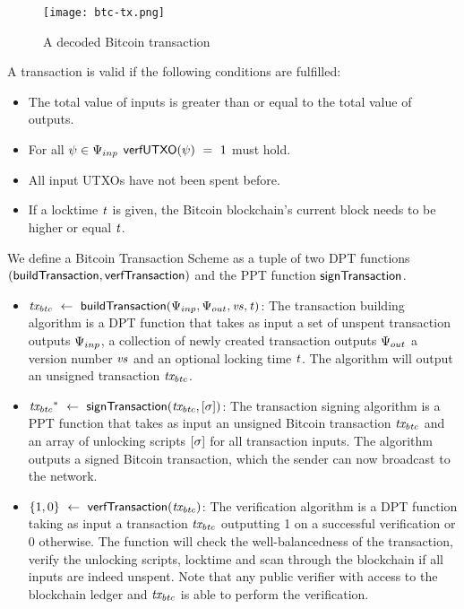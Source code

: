\begin{figure}
    \begin{center}
        \texttt{[image: btc-tx.png]}
    \end{center}
    \caption{A decoded Bitcoin transaction} \label{fig:btc-tx}
\end{figure}

A transaction is valid if the following conditions are fulfilled:

\begin{itemize}
    \item The total value of inputs is greater than or equal to the total value of outputs.
    \item For all $\psi \in \Psi_{inp}$ $\mathsf{verfUTXO}(\psi) ~=~ 1$ must hold.
    \item All input UTXOs have not been spent before.
    \item If a locktime $\mathit{t}$ is given, the Bitcoin blockchain's current block needs to be higher or equal $\mathit{t}$.
\end{itemize}

\begin{definition}
    We define a Bitcoin Transaction Scheme as a tuple of two DPT functions $(\mathsf{buildTransaction}, \mathsf{verfTransaction})$ and the PPT function $\mathsf{signTransaction}$.
    \begin{itemize}
        \item $\mathit{tx_{btc}} ~\leftarrow~ \mathsf{buildTransaction}(\Psi_{inp},\Psi_{out},\mathit{vs},\mathit{t})$: The transaction building algorithm is a DPT function that takes as input a set of unspent transaction outputs $\Psi_{inp}$, a collection of newly created transaction outputs $\Psi_{out}$ a version number $\mathit{vs}$ and an optional locking time $\mathit{t}$.
        The algorithm will output an unsigned transaction $\mathit{tx_{btc}}$.
        \item $\mathit{tx_{btc}}^* ~\leftarrow~ \mathsf{signTransaction} (\mathit{tx_{btc}},[\mathit{\sigma}])$: The transaction
        signing algorithm is a PPT function that takes as input an unsigned Bitcoin transaction $\mathit{tx_{btc}}$ and an array
        of unlocking scripts $[\mathit{\sigma}]$ for all transaction inputs.
        The algorithm outputs a signed Bitcoin transaction, which the sender can now broadcast to the network.
        \item $\{ 1,0 \} ~\leftarrow~ \mathsf{verfTransaction}(\mathit{tx_{btc}})$: The verification algorithm is a DPT function taking as input a transaction $\mathit{tx_{btc}}$ outputting 1 on a successful verification or 0 otherwise.
        The function will check the well-balancedness of the transaction, verify the unlocking scripts, locktime and scan through the blockchain if all inputs are indeed unspent.
        Note that any public verifier with access to the blockchain ledger and $\mathit{tx_{btc}}$ is able to perform the verification.
    \end{itemize}
\end{definition}

